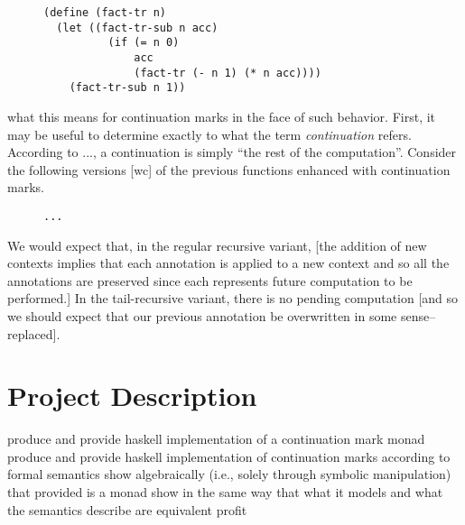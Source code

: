 \documentclass[ms]{byuprop}
\begin{document}
\begin{figure}
\label{fac-tail-rec}
\begin{verbatim}
(define (fact-tr n)
  (let ((fact-tr-sub n acc)
          (if (= n 0)
              acc
              (fact-tr (- n 1) (* n acc))))
    (fact-tr-sub n 1))
\end{verbatim}
\end{figure}

what this means for continuation marks in the face of such behavior. 
First, it may be useful to determine exactly to what the term 
\emph{continuation} refers. According to ..., a continuation is simply 
``the rest of the computation''. Consider the following versions [wc] of 
the previous functions enhanced with continuation marks.

\begin{figure}
\label{fac-rec-cm}
\begin{verbatim}
...
\end{verbatim}
\end{figure}


We would expect that, in the regular recursive variant, [the addition of new contexts implies that each annotation is applied to a new context and so all the annotations are preserved since each represents future computation to be performed.] In the tail-recursive variant, there is no pending computation [and so we should expect that our previous annotation be overwritten in some sense--replaced].






\section{Project Description}

produce and provide haskell implementation of a continuation mark monad
produce and provide haskell implementation of continuation marks according to formal semantics
show algebraically (i.e., solely through symbolic manipulation) that provided is a monad
show in the same way that what it models and what the semantics describe are equivalent
profit
\end{document}
